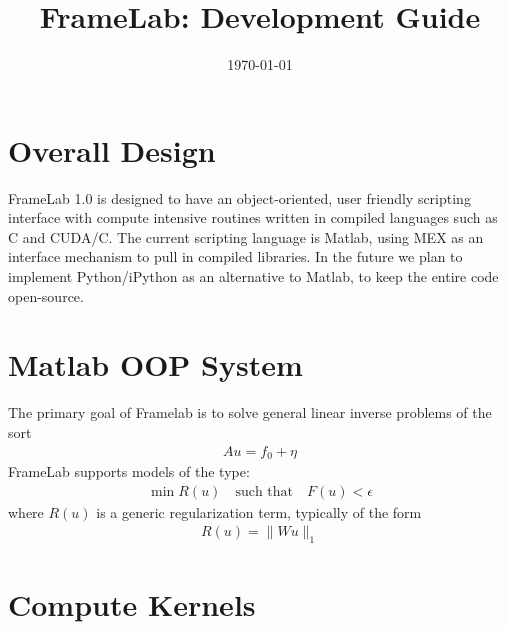 \documentclass[12pt]{article}
\title{FrameLab: Development Guide}
\date{\today}
\begin{document}
\maketitle

\section{Overall Design}
FrameLab 1.0 is designed to have an object-oriented, user friendly scripting interface with compute intensive routines written in compiled languages such as C and CUDA/C.  The current scripting language is Matlab, using MEX as an interface mechanism to pull in compiled libraries.  In the future we plan to implement Python/iPython as an alternative to Matlab, to keep the entire code open-source.

\section{Matlab OOP System}
The primary goal of Framelab is to solve general linear inverse problems of the sort 
\begin{align*}
Au = f_0 + \eta 
\end{align*} FrameLab supports models of the type: 
\begin{align*}
\min R(u) \quad \text{such that}\quad F(u)<\epsilon 
\end{align*}where $R(u)$ is a generic regularization term, typically of the form 
\begin{align*}
R(u) = \|Wu\|_1
\end{align*}


\section{Compute Kernels}
\end{document}
